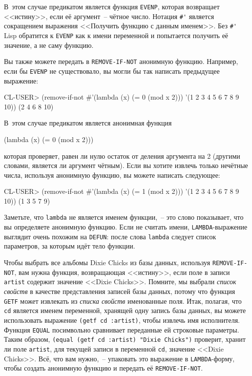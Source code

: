 В~этом случае предикатом является функция \lstinline{EVENP}, которая возвращает <<истину>>,
если её аргумент~-- чётное число. Нотация \lstinline!#'! является сокращением выражения
<<Получить функцию с данным именем>>. Без \lstinline!#'! Lisp обратится к \lstinline{EVENP} как к
имени переменной и попытается получить её значение, а не саму функцию.

Вы также можете передать в \lstinline{REMOVE-IF-NOT} анонимную функцию. Например, если бы
\lstinline{EVENP} не существовало, вы могли бы так написать предыдущее выражение:

\begin{myverb}
CL-USER> (remove-if-not #'(lambda (x) (= 0 (mod x 2))) '(1 2 3 4 5 6 7 8 9 10))
(2 4 6 8 10)
\end{myverb}

В~этом случае предикатом является анонимная функция

\begin{myverb}
(lambda (x) (= 0 (mod x 2)))
\end{myverb}

\noindent{}которая проверяет, равен ли нулю остаток от деления аргумента на 2 (другими словами,
является ли аргумент чётным). Если вы хотите извлечь только нечётные числа, используя
анонимную функцию, вы можете написать следующее:

\begin{myverb}
CL-USER> (remove-if-not #'(lambda (x) (= 1 (mod x 2))) '(1 2 3 4 5 6 7 8 9 10))
(1 3 5 7 9)
\end{myverb}

Заметьте, что \lstinline{lambda} не является именем функции,~-- это слово показывает, что вы
определяете анонимную функцию. Если не считать имени, \lstinline{LAMBDA}-выражение
выглядит очень похожим на \lstinline{DEFUN}: после слова \lstinline{lambda} следует список
параметров, за которым идёт тело функции.

Чтобы выбрать все альбомы Dixie Chicks из базы данных, используя
\lstinline{REMOVE-IF-NOT}, вам нужна функция, возвращающая <<истину>>, если поле в записи
\lstinline{artist} содержит значение <<Dixie Chicks>>. Помните, мы выбрали \textit{список
  свойств} в качестве представления записей базы данных, потому что функция
\lstinline{GETF} может извлекать из \textit{списка свойств} именованные поля. Итак,
полагая, что \lstinline{cd} является именем переменной, хранящей одну запись базы данных,
вы можете использовать выражение \lstinline{(getf cd :artist)}, чтобы извлечь имя
исполнителя. Функция \lstinline{EQUAL} посимвольно сравнивает переданные ей строковые
параметры. Таким образом, \lstinline{(equal (getf cd :artist) "Dixie Chicks")} проверит,
хранит ли поле \lstinline{artist}, для текущей записи в переменной \lstinline{cd},
значение <<Dixie Chicks>>. Всё, что вам нужно,~-- упаковать это выражение в
\lstinline{LAMBDA}-форму, чтобы создать анонимную функцию и передать её
\lstinline{REMOVE-IF-NOT}.

